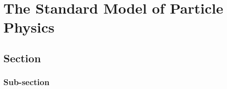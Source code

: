
\chapter{The Standard Model of Particle Physics}
\section{Section}
\subsection{Sub-section}
\cite{Stewart-Tackmann:2012}
